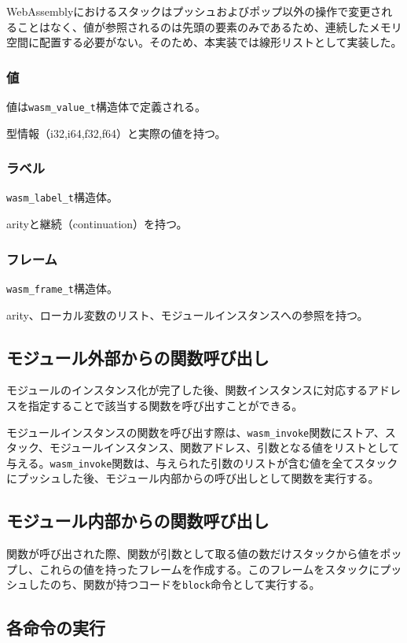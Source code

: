 WebAssemblyにおけるスタックはプッシュおよびポップ以外の操作で変更されることはなく、値が参照されるのは先頭の要素のみであるため、連続したメモリ空間に配置する必要がない。そのため、本実装では線形リストとして実装した。

\subsubsection{値}
値は\verb|wasm_value_t|構造体で定義される。

型情報（i32,i64,f32,f64）と実際の値を持つ。

\subsubsection{ラベル}
\verb|wasm_label_t|構造体。

arityと継続（continuation）を持つ。

\subsubsection{フレーム}
\verb|wasm_frame_t|構造体。

arity、ローカル変数のリスト、モジュールインスタンスへの参照を持つ。

\subsection{モジュール外部からの関数呼び出し}

モジュールのインスタンス化が完了した後、関数インスタンスに対応するアドレスを指定することで該当する関数を呼び出すことができる。

モジュールインスタンスの関数を呼び出す際は、\verb|wasm_invoke|関数にストア、スタック、モジュールインスタンス、関数アドレス、引数となる値をリストとして与える。\verb|wasm_invoke|関数は、与えられた引数のリストが含む値を全てスタックにプッシュした後、モジュール内部からの呼び出しとして関数を実行する。

\subsection{モジュール内部からの関数呼び出し}

関数が呼び出された際、関数が引数として取る値の数だけスタックから値をポップし、これらの値を持ったフレームを作成する。このフレームをスタックにプッシュしたのち、関数が持つコードを\verb|block|命令として実行する。

\subsection{各命令の実行}

